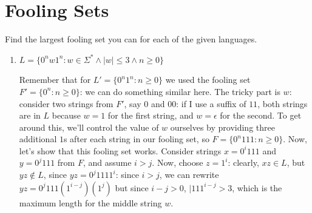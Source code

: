 \documentclass[fleqn]{article}
\begin{document}
\section{Fooling Sets}
Find the largest fooling set you can for each of the given languages.
\begin{enumerate}
    \item $L = \{0^n w 1^n : w \in \Sigma^* \wedge |w| \leq 3 \wedge n \geq 0\}$
    \begin{answer}
        Remember that for $L' = \{0^n 1^n : n \geq 0\}$ we used the fooling set $F' = \{0^n : n \geq 0\}$: we can do something similar here. The tricky part is $w$: consider two strings from $F'$, say $0$ and $00$: if I use a suffix of $11$, both strings are in $L$ because $w = 1$ for the first string, and $w = \epsilon$ for the second. To get around this, we'll control the value of $w$ ourselves by providing three additional $1$s after each string in our fooling set, so 
        $\boxed{F = \{0^n 111 : n \geq 0\}}$. Now, let's show that this fooling set works. Consider strings $x = 0^i 111$ and $y = 0^j 111$ from $F$, and assume $i > j$. Now, choose $z = 1^i$: clearly, $xz \in L$, but $yz \notin L$, since $yz = 0^j 111 1^i$: since $i > j$, we can rewrite $yz = 0^j 111 (1^{i-j}) (1^j)$ but since $i - j > 0$, $|111 ^{i-j} > 3$, which is the maximum length for the middle string $w$.


\end{answer}
\end{enumerate}
\end{document}

